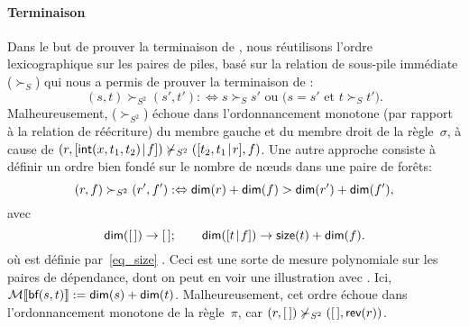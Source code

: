 \paragraph{Terminaison}
\hspace*{-1pt}
  Dans le but de prouver
la terminaison de , nous réutilisons
l'ordre lexicographique sur les paires de piles, basé sur la relation
de sous-pile immédiate (\(\succ_{S}\)) qui nous a permis de prouver la terminaison de
 :
\begin{equation*}
(s,t) \succ_{S^2} (s',t') :\Leftrightarrow \text{\(s \succ_{S} s'\) ou
    (\(s = s'\) et \(t \succ_{S} t'\))}.
\end{equation*}
Malheureusement, (\(\succ_{S^2}\)) échoue dans l'ordonnancement
monotone (par rapport à la relation de réécriture) du membre gauche et
du membre droit de la règle~\(\sigma\), à cause de
\((r,[{\textsf{int}(x,t_1,t_2)}\!\mid\!{f}]) \nsucc_{S^2}
([{t_2,t_1}\!\mid\!{r}],f)\). Une autre approche consiste à définir un
ordre bien fondé sur le nombre de n{\oe}uds dans une paire de forêts:
\begin{equation*}
(r,f) \succ_{S^2} (r',f') :\Leftrightarrow \textsf{dim}(r) +
  \textsf{dim}(f) > \textsf{dim}(r') + \textsf{dim}(f'),
\end{equation*}
avec
\begin{equation*}
\textsf{dim}([\,]) \rightarrow [\,];\qquad
\textsf{dim}([{t}\!\mid\!{f}]) \rightarrow \textsf{size}(t) + \textsf{dim}(f).
\end{equation*}
où 
est définie par~\eqref{eq_size} . Ceci est une sorte
de mesure polynomiale sur les
paires de dépendance, dont on
peut en voir une illustration avec
. Ici, \(\mathcal{M}\llbracket{\textsf{bf}(s,t)}\rrbracket :=
\textsf{dim}(s) + \textsf{dim}(t)\). Malheureusement, cet ordre échoue dans
l'ordonnancement monotone de la règle~\(\pi\), car \((r,[\,])
\nsucc_{S^2} ([\,],\textsf{rev}(r))\).

